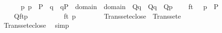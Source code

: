 \begin{isabellebody}
\ \ \ \ {\isachardoublequoteopen}{\isasymAnd}{\isasymtau}\ {\isasymtheta}\ p{\isachardot}{\kern0pt}\ p\ {\isasymin}\ P\ {\isasymLongrightarrow}\ {\isasymlbrakk}{\isasymAnd}q\ {\isasymsigma}{\isachardot}{\kern0pt}\ {\isasymlbrakk}q{\isasymin}P\ {\isacharsemicolon}{\kern0pt}\ {\isasymsigma}{\isasymin}domain{\isacharparenleft}{\kern0pt}{\isasymtau}{\isacharparenright}{\kern0pt}\ {\isasymunion}\ domain{\isacharparenleft}{\kern0pt}{\isasymtheta}{\isacharparenright}{\kern0pt}{\isasymrbrakk}\ {\isasymLongrightarrow}\ Q{\isacharparenleft}{\kern0pt}{}{\isacharcomma}{\kern0pt}{\isasymsigma}{\isacharcomma}{\kern0pt}{\isasymtau}{\isacharcomma}{\kern0pt}q{\isacharparenright}{\kern0pt}\ {\isasymand}\ Q{\isacharparenleft}{\kern0pt}{}{\isacharcomma}{\kern0pt}{\isasymsigma}{\isacharcomma}{\kern0pt}{\isasymtheta}{\isacharcomma}{\kern0pt}q{\isacharparenright}{\kern0pt}{\isasymrbrakk}\ {\isasymLongrightarrow}\ Q{\isacharparenleft}{\kern0pt}{}{\isacharcomma}{\kern0pt}{\isasymtau}{\isacharcomma}{\kern0pt}{\isasymtheta}{\isacharcomma}{\kern0pt}p{\isacharparenright}{\kern0pt}{\isachardoublequoteclose}\isanewline
\ \ \ \ {\isachardoublequoteopen}ft\ {\isasymin}\ {}{\isachardoublequoteclose}\ {\isachardoublequoteopen}p\ {\isasymin}\ P{\isachardoublequoteclose}\isanewline
\ \ \isanewline
\ \ \ \ {\isachardoublequoteopen}Q{\isacharparenleft}{\kern0pt}ft{\isacharcomma}{\kern0pt}{\isasymtau}{\isacharcomma}{\kern0pt}{\isasymtheta}{\isacharcomma}{\kern0pt}p{\isacharparenright}{\kern0pt}{\isachardoublequoteclose}\isanewline
%
\isadelimproof
%
\endisadelimproof
%
\isatagproof
{}\isamarkupfalse%
\ {\isacharminus}{\kern0pt}\isanewline
\ \ \isacommand{{\isacharbraceleft}{\kern0pt}}\isamarkupfalse%
\isanewline
\ \ \ \ \isamarkupfalse%
\ ft\ p\ {\isasymtau}\ {\isasymtheta}\isanewline
\ \ \ \ \isamarkupfalse%
\ {\isachardoublequoteopen}Transset{\isacharparenleft}{\kern0pt}eclose{\isacharparenleft}{\kern0pt}{\isacharbraceleft}{\kern0pt}{\isasymtau}{\isacharcomma}{\kern0pt}{\isasymtheta}{\isacharbraceright}{\kern0pt}{\isacharparenright}{\kern0pt}{\isacharparenright}{\kern0pt}{\isachardoublequoteclose}\ {\isacharparenleft}{\kern0pt}\ {\isachardoublequoteopen}Transset{\isacharparenleft}{\kern0pt}{\isacharquery}{\kern0pt}e{\isacharparenright}{\kern0pt}{\isachardoublequoteclose}{\isacharparenright}{\kern0pt}\ \isanewline
\ \ \ \ \ \ \isamarkupfalse%
\ Transset{\isacharunderscore}{\kern0pt}eclose\ \isamarkupfalse%
\ simp\isanewline
\ \ \ \ \isamarkupfalse%

\end{isabellebody}
